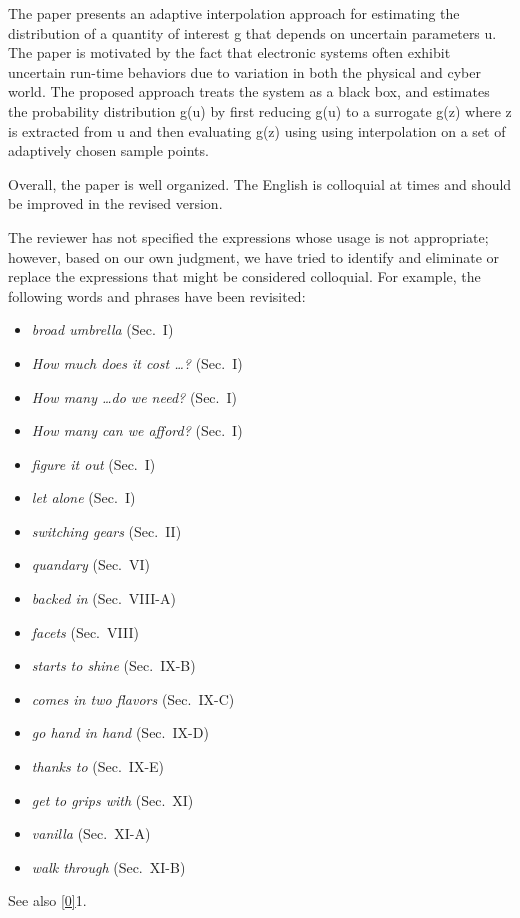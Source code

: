 \begin{reviewer}
The paper presents an adaptive interpolation approach for estimating the
distribution of a quantity of interest g that depends on uncertain parameters u.
The paper is motivated by the fact that electronic systems often  exhibit
uncertain run-time behaviors due to variation in both the physical and cyber
world. The proposed approach treats the system as a black box, and estimates the
probability distribution g(u) by first reducing g(u) to a surrogate g(z) where z
is extracted from u and then evaluating g(z) using using interpolation on a set
of adaptively chosen sample points.

Overall, the paper is well organized. The English is colloquial at times and
should be improved in the revised version.
\end{reviewer}

\begin{authors}
The reviewer has not specified the expressions whose usage is not appropriate;
however, based on our own judgment, we have tried to identify and eliminate or
replace the expressions that might be considered colloquial. For example, the
following words and phrases have been revisited:

\begin{itemize}
  \item \emph{broad umbrella} (Sec.~I)
  \item \emph{How much does it cost \dots?} (Sec.~I)
  \item \emph{How many \dots do we need?} (Sec.~I)
  \item \emph{How many can we afford?} (Sec.~I)
  \item \emph{figure it out} (Sec.~I)
  \item \emph{let alone} (Sec.~I)
  \item \emph{switching gears} (Sec.~II)
  \item \emph{quandary} (Sec.~VI)
  \item \emph{backed in} (Sec.~VIII-A)
  \item \emph{facets} (Sec.~VIII)
  \item \emph{starts to shine} (Sec.~IX-B)
  \item \emph{comes in two flavors} (Sec.~IX-C)
  \item \emph{go hand in hand} (Sec.~IX-D)
  \item \emph{thanks to} (Sec.~IX-E)
  \item \emph{get to grips with} (Sec.~XI)
  \item \emph{vanilla} (Sec.~XI-A)
  \item \emph{walk through} (Sec.~XI-B)
\end{itemize}

See also \cref{0}{1}.

\begin{actions}
\end{actions}
\end{authors}


